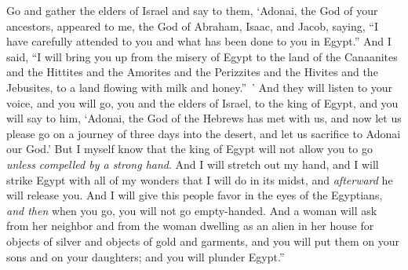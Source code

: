 \begin{biblechapter}
\verse Go and gather the elders of Israel and say to them, ‘Adonai, the God of your ancestors, appeared to me, the God of Abraham, Isaac, and Jacob, saying, “I have carefully attended to you and what has been done to you in Egypt.”
\verse And I said, “I will bring you up from the misery of Egypt to the land of the Canaanites and the Hittites and the Amorites and the Perizzites and the Hivites and the Jebusites, to a land flowing with milk and honey.” ’
\verse And they will listen to your voice, and you will go, you and the elders of Israel, to the king of Egypt, and you will say to him, ‘Adonai, the God of the Hebrews has met with us, and now let us please go on a journey of three days into the desert, and let us sacrifice to Adonai our God.’
\verse But I myself know that the king of Egypt will not allow you to go \textit{unless compelled by a strong hand}.
\verse And I will stretch out my hand, and I will strike Egypt with all of my wonders that I will do in its midst, and \textit{afterward} he will release you.
\verse And I will give this people favor in the eyes of the Egyptians, \textit{and then} when you go, you will not go empty-handed.
\verse And a woman will ask from her neighbor and from the woman dwelling as an alien in her house for objects of silver and objects of gold and garments, and you will put them on your sons and on your daughters; and you will plunder Egypt.”
\end{biblechapter}

